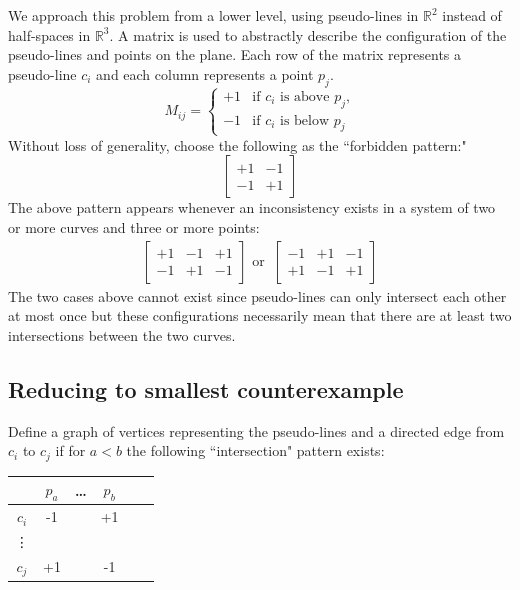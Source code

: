 \documentclass{NSF}
\begin{document}
We approach this problem from a lower level, using pseudo-lines in $\mathbb{R}^2$ instead of half-spaces in $\mathbb{R}^3$. A matrix is used to abstractly describe the configuration of the pseudo-lines and points on the plane. Each row of the matrix represents a pseudo-line $c_i$ and each column represents a point $p_j$. 
\begin{equation*}
M_{ij} =\begin{cases}
            	+1 & \text{if $c_i$ is above $p_j$,} \\
                -1 & \text{if $c_i$ is below $p_j$}
            \end{cases}
\end{equation*}
Without loss of generality, choose the following as the ``forbidden pattern:" 
\begin{equation}
\begin{bmatrix}
    +1 & -1 \\
    -1 & +1 
\end{bmatrix}
\end{equation}
The above pattern appears whenever an inconsistency exists in a system of two or more curves and three or more points:
\begin{align*}
\begin{bmatrix}
    +1 & -1 & +1 \\
    -1 & +1 & -1
\end{bmatrix} \text{ or }\ 
\begin{bmatrix}
    -1 & +1 & -1  \\
    +1 & -1 & +1
\end{bmatrix}
\end{align*}
The two cases above cannot exist since pseudo-lines can only intersect each other at most once but these configurations necessarily mean that there are at least two intersections between the two curves. 

\subsection{Reducing to smallest counterexample}
Define a graph of vertices representing the pseudo-lines and a directed edge from $c_i$ to $c_j$ if for $a<b$ the following ``intersection" pattern exists:

\begin{center}
\begin{tabular}{c|c c c c c }
                     & $p_a$   & \dots  & $p_b$      \\ \hline
$c_i$                  &  -1   &        & +1       \\
\vdots               &       &        &          \\
$c_j$                  &  +1   &        & -1  \\
\end{tabular}
\end{center}
\end{document}
